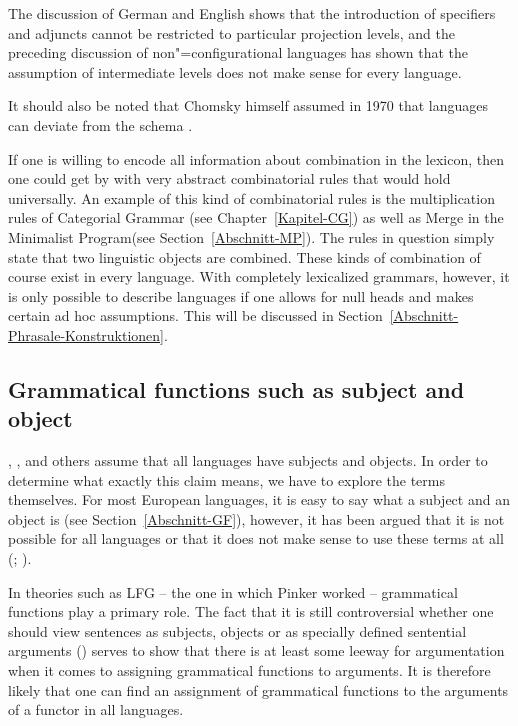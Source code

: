 The discussion of German and English shows that the introduction of specifiers and adjuncts cannot be restricted to particular projection levels, and
the preceding discussion of non"=configurational languages has shown that the assumption of intermediate levels does not make sense for every language.

It should also be noted that Chomsky himself assumed in 1970 that languages can deviate from the \xbar
schema \citeyearpar[]{Chomsky70a}.

If one is willing to encode all information about combination in the lexicon, then one could get by with very abstract combinatorial rules that would hold universally.
An example of this kind of combinatorial rules is the multiplication rules of Categorial Grammar (see Chapter~\ref{Kapitel-CG}) 
as well as Merge in the Minimalist Program\indexmp (see Section~\ref{Abschnitt-MP}).
The rules in question simply state that two linguistic objects are combined. These kinds of
combination of course exist in every language. With completely lexicalized grammars, however, it is only possible to describe languages
if one allows for null heads and makes certain ad hoc assumptions. This will be discussed in
Section~\ref{Abschnitt-Phrasale-Konstruktionen}. 

\subsection{Grammatical functions such as subject and object}
\label{Abschnitt-UG-EPP}

\mbox{}\citet[\page xxv]{BK82a}, \citet[--237]{Pinker94a}, \citet[]{Baker2003b} 
and others assume that all languages have subjects and objects. In order to determine what exactly this claim means, we have to explore the terms
themselves. For most European languages, it is easy to say what a subject and an object is (see Section~\ref{Abschnitt-GF}), however,
it has been argued that it is not possible for all languages or that it does not make sense to use
these terms at all (\citealp[Chapter~4]{Croft2001a}; \citealp[Section~4]{EL2009a}).

In theories such as LFG\indexlfg{} -- the one in which Pinker worked -- grammatical functions play a primary role. The fact that it is still
controversial whether one should view sentences as subjects, objects or as specially defined sentential arguments (\xcomp) \citep*{DL2000a-u,Berman2003a-u,Berman2007a-u,AMM2005a-u,Forst2006a-u}
serves to show that there is at least some leeway for argumentation when it comes to assigning
grammatical functions to arguments. It is therefore likely that one can find an assignment of
grammatical functions to the arguments of a functor in all languages. 

